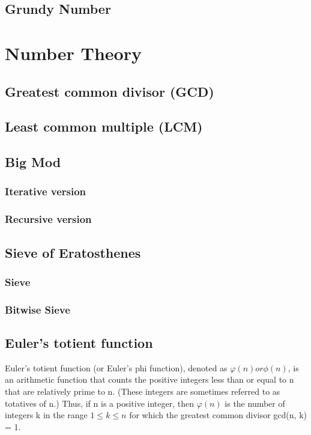 \documentclass[11pt]{report}
\begin{document}
\section{Grundy Number}


\chapter{Number Theory}
\section{Greatest common divisor (GCD)}

\section{Least common multiple (LCM)}

\section{Big Mod}
\subsection{Iterative version}

\subsection{Recursive version}

\section{Sieve of Eratosthenes}
\subsection{Sieve}

\subsection{Bitwise Sieve}

\section{Euler's totient function}
Euler's totient function (or Euler's phi function), denoted as $\varphi (n) or  \phi(n)$, is an arithmetic function that counts the positive integers less than or equal to n that are relatively prime to n. (These integers are sometimes referred to as totatives of n.) Thus, if n is a positive integer, then $\varphi (n)$ is the number of integers k in the range $1 \leq k \leq n$ for which the greatest common divisor gcd(n, k) = 1.
\end{document}
